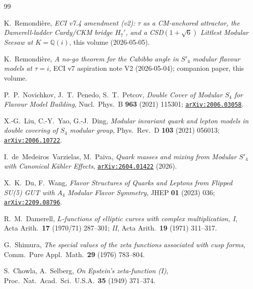 \documentclass[a4paper,11pt]{article}
\newcommand{\arXiv}[1]{\href{https://arxiv.org/abs/#1}{\texttt{arXiv:#1}}}
\newcommand{\Qi}{\mathbb{Q}(i)}
\theoremstyle{definition}
\theoremstyle{remark}
\begin{document}
\begin{thebibliography}{99}


K.~Remondi\`ere,
\emph{ECI v7.4 amendment (v2): $\tau$ as a CM-anchored attractor,
the Damerell-ladder Cardy/CKM bridge $H_7'$, and a CSD$(1+\sqrt 6)$
Littlest Modular Seesaw at $K=\Qi$}, this volume
(2026-05-05).

K.~Remondi\`ere,
\emph{A no-go theorem for the Cabibbo angle in $S'_4$ modular
flavour models at $\tau=i$},
ECI v7 aspiration note V2 (2026-05-04);
companion paper, this volume.

P.~P.~Novichkov, J.~T.~Penedo, S.~T.~Petcov,
\emph{Double Cover of Modular $S_4$ for Flavour Model Building},
Nucl.~Phys.~B \textbf{963} (2021) 115301;
\arXiv{2006.03058}.

X.-G.~Liu, C.-Y.~Yao, G.-J.~Ding,
\emph{Modular invariant quark and lepton models in double covering of
$S_4$ modular group},
Phys.~Rev.~D \textbf{103} (2021) 056013;
\arXiv{2006.10722}.

I.~de~Medeiros~Varzielas, M.~Paiva,
\emph{Quark masses and mixing from Modular $S'_4$ with Canonical
K\"ahler Effects}, \arXiv{2604.01422} (2026).

X.~K.~Du, F.~Wang,
\emph{Flavor Structures of Quarks and Leptons from Flipped SU(5) GUT
with $A_4$ Modular Flavor Symmetry},
JHEP \textbf{01} (2023) 036;
\arXiv{2209.08796}.

R.~M.~Damerell,
\emph{$L$-functions of elliptic curves with complex multiplication, I},
Acta Arith.\ \textbf{17} (1970/71) 287--301;
\emph{II}, Acta Arith.\ \textbf{19} (1971) 311--317.

G.~Shimura,
\emph{The special values of the zeta functions associated with cusp forms},
Comm.~Pure Appl.~Math.\ \textbf{29} (1976) 783--804.

S.~Chowla, A.~Selberg,
\emph{On Epstein's zeta-function (I)},
Proc.~Nat.~Acad.~Sci.~U.S.A.\ \textbf{35} (1949) 371--374.


\end{thebibliography}
\end{document}
